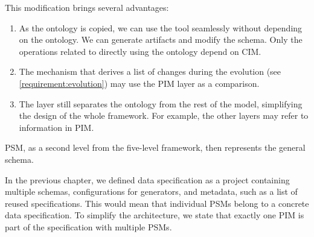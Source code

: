 This modification brings several advantages:
\begin{enumerate}
    \item As the ontology is copied, we can use the tool seamlessly without depending on the ontology. We can generate artifacts and modify the schema. Only the operations related to directly using the ontology depend on CIM.
    \item The mechanism that derives a list of changes during the evolution (see \autoref{requirement:evolution}) may use the PIM layer as a comparison.
    \item The layer still separates the ontology from the rest of the model, simplifying the design of the whole framework. For example, the other layers may refer to information in PIM.
\end{enumerate}

PSM, as a second level from the five-level framework, then represents the general schema.

In the previous chapter, we defined data specification as a project containing multiple schemas, configurations for generators, and metadata, such as a list of reused specifications. This would mean that individual PSMs belong to a concrete data specification. To simplify the architecture, we state that exactly one PIM is part of the specification with multiple PSMs.

